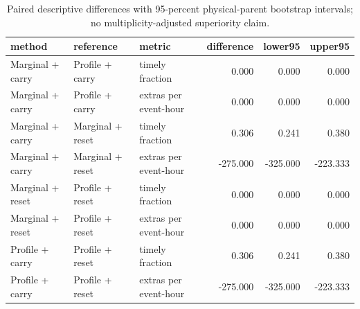 \begin{table}[t]\centering\scriptsize
\caption{Paired descriptive differences with 95-percent physical-parent bootstrap intervals; no multiplicity-adjusted superiority claim.}
\begin{tabular}{lllrrr}
\toprule
method & reference & metric & difference & lower95 & upper95 \\
\midrule
Marginal + carry & Profile + carry & timely fraction & 0.000 & 0.000 & 0.000 \\
Marginal + carry & Profile + carry & extras per event-hour & 0.000 & 0.000 & 0.000 \\
Marginal + carry & Marginal + reset & timely fraction & 0.306 & 0.241 & 0.380 \\
Marginal + carry & Marginal + reset & extras per event-hour & -275.000 & -325.000 & -223.333 \\
Marginal + reset & Profile + reset & timely fraction & 0.000 & 0.000 & 0.000 \\
Marginal + reset & Profile + reset & extras per event-hour & 0.000 & 0.000 & 0.000 \\
Profile + carry & Profile + reset & timely fraction & 0.306 & 0.241 & 0.380 \\
Profile + carry & Profile + reset & extras per event-hour & -275.000 & -325.000 & -223.333 \\
\bottomrule
\end{tabular}
\end{table}
